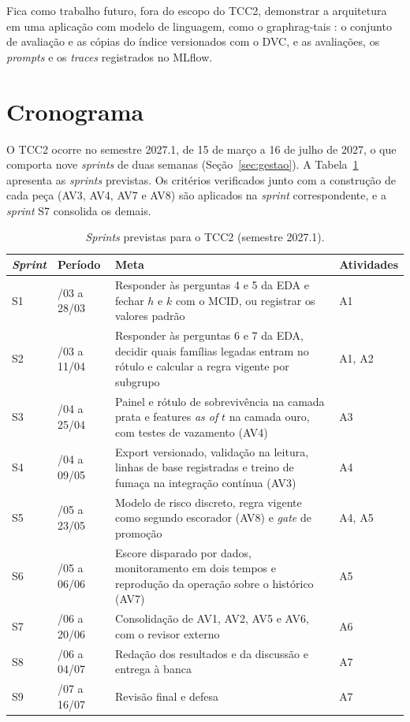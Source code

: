 Fica como trabalho futuro, fora do escopo do TCC2, demonstrar a arquitetura em uma aplicação com modelo de linguagem, como o graphrag-tais \cite{graphragtais}: o conjunto de avaliação e as cópias do índice versionados com o DVC, e as avaliações, os \textit{prompts} e os \textit{traces} registrados no MLflow.

\section{Cronograma}

O TCC2 ocorre no semestre 2027.1, de 15 de março a 16 de julho de 2027, o que comporta nove \textit{sprints} de duas semanas (Seção~\ref{sec:gestao}). A Tabela~\ref{tab:cronograma} apresenta as \textit{sprints} previstas. Os critérios verificados junto com a construção de cada peça (AV3, AV4, AV7 e AV8) são aplicados na \textit{sprint} correspondente, e a \textit{sprint} S7 consolida os demais.

\begin{table}[htbp]
	\centering
	\caption{\textit{Sprints} previstas para o TCC2 (semestre 2027.1).}
	\label{tab:cronograma}
	\small
	\begin{tabularx}{\textwidth}{@{}l>{\raggedright\arraybackslash}p{2.6cm}>{\raggedright\arraybackslash}X l@{}}
		\toprule
		\textbf{\textit{Sprint}} & \textbf{Período} & \textbf{Meta} & \textbf{Atividades} \\
		\midrule
		S1 & 15/03 a 28/03 & Responder às perguntas 4 e 5 da EDA e fechar $h$ e $k$ com o MCID, ou registrar os valores padrão & A1 \\ \addlinespace
		S2 & 29/03 a 11/04 & Responder às perguntas 6 e 7 da EDA, decidir quais famílias legadas entram no rótulo e calcular a regra vigente por subgrupo & A1, A2 \\ \addlinespace
		S3 & 12/04 a 25/04 & Painel e rótulo de sobrevivência na camada prata e features \textit{as of} $t$ na camada ouro, com testes de vazamento (AV4) & A3 \\ \addlinespace
		S4 & 26/04 a 09/05 & Export versionado, validação na leitura, linhas de base registradas e treino de fumaça na integração contínua (AV3) & A4 \\ \addlinespace
		S5 & 10/05 a 23/05 & Modelo de risco discreto, regra vigente como segundo escorador (AV8) e \textit{gate} de promoção & A4, A5 \\ \addlinespace
		S6 & 24/05 a 06/06 & Escore disparado por dados, monitoramento em dois tempos e reprodução da operação sobre o histórico (AV7) & A5 \\ \addlinespace
		S7 & 07/06 a 20/06 & Consolidação de AV1, AV2, AV5 e AV6, com o revisor externo & A6 \\ \addlinespace
		S8 & 21/06 a 04/07 & Redação dos resultados e da discussão e entrega à banca & A7 \\ \addlinespace
		S9 & 05/07 a 16/07 & Revisão final e defesa & A7 \\
		\bottomrule
	\end{tabularx}
\end{table}

